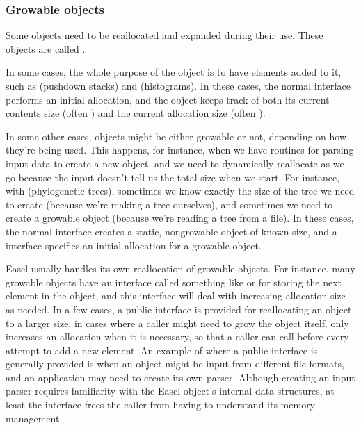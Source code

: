   \subsubsection{Growable objects}

Some objects need to be reallocated and expanded during their use.
These objects are called .

In some cases, the whole purpose of the object is to have elements
added to it, such as  (pushdown stacks) and
 (histograms). In these cases, the normal
 interface performs an initial allocation, and the
object keeps track of both its current contents size (often
) and the current allocation size (often
). 

In some other cases, objects might be either growable or not,
depending on how they're being used. This happens, for instance, when
we have routines for parsing input data to create a new object, and we
need to dynamically reallocate as we go because the input doesn't tell
us the total size when we start. For instance, with 
(phylogenetic trees), sometimes we know exactly the size of the tree
we need to create (because we're making a tree ourselves), and
sometimes we need to create a growable object (because we're reading a
tree from a file). In these cases, the normal 
interface creates a static, nongrowable object of known size, and a
 interface specifies an initial allocation
for a growable object.

Easel usually handles its own reallocation of growable objects. For
instance, many growable objects have an interface called something
like  or  for storing the next element
in the object, and this interface will deal with increasing allocation
size as needed.  In a few cases, a public  interface
is provided for reallocating an object to a larger size, in cases
where a caller might need to grow the object itself. 
only increases an allocation when it is necessary, so that a caller
can call  before every attempt to add a new
element. An example of where a public  interface is
generally provided is when an object might be input from different
file formats, and an application may need to create its own
parser. Although creating an input parser requires familiarity with
the Easel object's internal data structures, at least the
 interface frees the caller from having to understand
its memory management.

